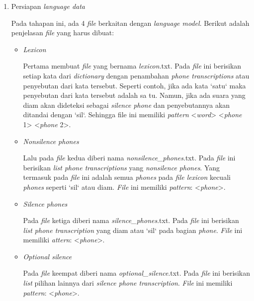 \begin{enumerate}
\item Persiapan \textit{language data}
\par Pada tahapan ini, ada 4 \textit{file} berkaitan dengan \textit{language model}. Berikut adalah penjelasan \textit{file} yang harus dibuat:
	\begin{itemize}
	\item \textit{Lexicon}
	\par Pertama membuat \textit{file} yang bernama \textit{lexicon}.txt. Pada \textit{file} ini berisikan setiap kata dari \textit{dictionary} dengan penambahan \textit{phone transcriptions} atau penyebutan dari kata tersebut. Seperti contoh, jika ada kata `satu` maka penyebutan dari kata tersebut adalah sa tu. Namun, jika ada suara yang diam akan dideteksi sebagai \textit{silence phone} dan penyebutannya akan ditandai dengan `sil`. Sehingga file ini memiliki \textit{pattern} <\textit{word}> <\textit{phone} 1> <\textit{phone} 2>.
	
	\item \textit{Nonsilence phones}
	\par Lalu pada \textit{file} kedua diberi nama \textit{nonsilence\_phones}.txt. Pada \textit{file} ini berisikan \textit{list phone transcriptions} yang \textit{nonsilence phones}. Yang termasuk pada \textit{file} ini adalah semua \textit{phones} pada \textit{file lexicon} kecuali \textit{phones} seperti `sil` atau diam. \textit{File} ini memiliki \textit{pattern}: <\textit{phone}>.
	
	\item \textit{Silence phones}
	\par Pada \textit{file} ketiga diberi nama \textit{silence\_phones}.txt. Pada \textit{file} ini berisikan \textit{list phone transcription} yang diam atau `sil` pada bagian \textit{phone}. \textit{File} ini memiliki \textit{attern}: <\textit{phone}>.
	
	\item \textit{Optional silence}
	\par Pada \textit{file} keempat diberi nama \textit{optional\_silence}.txt. Pada \textit{file} ini berisikan \textit{list} pilihan lainnya dari \textit{silence phone transcription}. \textit{File} ini memiliki \textit{pattern}: <\textit{phone}>.
	\end{itemize}

\end{enumerate}


